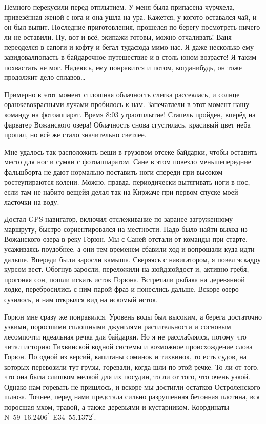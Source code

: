 Немного перекусили перед отплытием. У меня была припасена чурчхела, привезённая женой с юга и она ушла на ура. Кажется, у кого\sdash то оставался чай, и он был выпит. Последние приготовления, прошелся по берегу посмотреть ничего ли не оставили. Ну, вот и всё, экипажи готовы, можно отчаливать! Ваня переоделся в сапоги и кофту и бегал туда\sdash сюда мимо нас. Я даже несколько ему завидовал\mdash попасть в байдарочное путешествие и в столь юном возрасте! Я таким похвастать не мог. Надеюсь, ему понравится и потом, когда\sdash нибудь, он тоже продолжит дело сплавов\ldots

Примерно в этот момент сплошная облачность слегка рассеялась, и солнце оранжево\sdash красными лучами пробилось к нам. Запечатлели в этот момент нашу команду на фотоаппарат. Время 8:03 утра\mdash отплытие! Стапель пройден, вперёд на фарватер Вожанского  озера! Облачность снова сгустилась, красивый цвет неба пропал, но всё же стало значительно светлее.

Мне удалось так расположить вещи в грузовом отсеке байдарки, чтобы оставить место для ног и сумки с фотоаппаратом. Сане в этом повезло меньше\mdash передние фальшборта не дают нормально поставить ноги спереди при высоком росте\mdash упираются колени. Можно, правда, периодически вытягивать ноги в нос, если там не набито вещей\mdash я делал так на Киржаче при первом спуске моей ласточки на воду.  

Достал GPS навигатор, включил отслеживание по заранее загруженному маршруту, быстро сориентировался на местности. Надо было найти выход из Вожанского озера в реку Горюн. Мы с Саней отстали от команды при старте, усаживаясь поудобнее, а они тем временем сбавили ход и вопрошали куда идти дальше. Впереди были заросли камыша. Сверяясь с навигатором, я повел эскадру курсом вест. Обогнув заросли, переложили на зюйд\sdash зюйд\sdash ост и, активно гребя, прогоняя сон, пошли искать исток Горюна. Встретили рыбака на деревянной лодке, перебросились с ним парой фраз и понеслись дальше. Вскоре озеро сузилось, и нам открылся вид на искомый исток.

Горюн мне сразу же понравился. Уровень воды был высоким, а берега достаточно узкими, поросшими сплошными джунглями растительности и сосновым лесом\mdash почти идеальная речка для байдарки. Но я не расслаблялся, потому что читал историю Тихвинской водной системы и возможное происхождение слова Горюн. По одной из версий, капитаны соминок и тихвинок, то есть судов, на которых перевозили тут грузы, горевали, когда шли по этой речке. То ли от того, что она была слишком мелкой для их посудин, то ли от того, что очень узкой. Однако нам горевать не пришлось, и вскоре мы достигли остатков Остроленского шлюза. Точнее, перед нами предстала сильно разрушенная бетонная плотина, вся поросшая мхом, травой, а также деревьями и кустарником. Координаты N~59\degree~16.2406$^\prime$~E34\degree~55.1372$^\prime$. 


